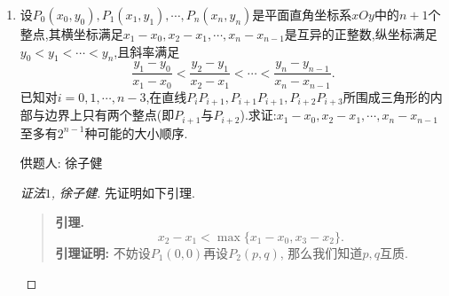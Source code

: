 \documentclass[lang=cn,12pt,a4paper]{elegantpaper.cls}
\begin{document}
\begin{enumerate}
\begin{proof}
\begin{enumerate}[label=(\alph*)]
			设$\beta \in\mathbb N^*$满足\[p_{\beta}\leq \dfrac{p_\varepsilon+1}{2}<p_{\beta+1},\]则\[\varepsilon-\beta=\pi(p_\varepsilon)-\pi(\dfrac{p_\varepsilon+1}{2})>\alpha,\]即$\varepsilon-\alpha>\beta$. 定义函数$g: \mathbb N^*\mapsto \mathbb N^*$, \[g(t)=\prod_{\substack{p\text{为素数}\\v_p(t)\text{为奇数}}} p.\]注意到\[\prod_{i=\alpha+1}^{\beta}(p_i^2-1)=2^{2\varepsilon-2\alpha}\prod_{i=\alpha+1}^{\varepsilon}\dfrac{p_i-1}{2}\prod_{i=\alpha+1}^{\varepsilon}\dfrac{p_i+1}{2},\]从而\[\Omega\left(\prod_{i=\alpha+1}^{\varepsilon}p_i^2-1\right)\leq \dfrac{p_\varepsilon+1}{2}.\]而对任意集合$A\subseteq \{\alpha+1,\alpha+2,\cdots,\varepsilon\}$,\[g\left(\prod_{i\in A}(p_i^2-1)\right)\in\left\{\prod_{i=1}^{\beta}p_i^{r_i}\Big| r_i\in\{0,1\}, 1\leq i\leq \beta\right\},\]从而$g\left(\prod_{i\in A}(p_i^2-1)\right)$的取值至多有$2^\beta$种可能. 又这样的$A$一共有$2^{\varepsilon-\alpha}$个, 且$2^{\varepsilon-\alpha}>2^\beta$, 故存在两个不同的集合$A_1,A_2\subseteq \{\alpha+1,\alpha+2,\cdots,\varepsilon\}$, 使得\[g\left(\prod_{i\in A_1}(p_i^2-1)\right)=g\left(\prod_{i\in A_2}(p_i^2-1)\right),\]这说明\[\prod_{i\in A_1}(p_i^2-1)\prod_{i\in A_2}(p_i^2-1)\]为完全平方数, 进而\[\prod_{i\in A_1\Delta A_2}(p_i^2-1)\]为完全平方数. 取非空集合$A'=A_1\Delta A_2$, 令\[l=\prod_{i\in A'}p_i,\]则\[\sigma(l)\varphi(l)=\prod_{i\in A_1\Delta A_2}(p_i^2-1)\]为完全平方数. 又$l$含有大于$p_\alpha$的素因子, 这与反证假设矛盾, 原命题得证.
		\end{enumerate}
	\end{proof}
	
	 \item
	 设$P_0(x_0,y_0),P_1(x_1,y_1),\cdots,P_n(x_n,y_n)$是平面直角坐标系$xOy$中的$n+1$个整点,其横坐标满足$x_1-x_0,x_2-x_1,\cdots,x_n-x_{n-1}$是互异的正整数,纵坐标满足$y_0<y_1<\cdots<y_n$,且斜率满足
	 \[\dfrac{y_1-y_0}{x_1-x_0}<\dfrac{y_2-y_1}{x_2-x_1}<\cdots<\dfrac{y_n-y_{n-1}}{x_n-x_{n-1}}.\]
	 已知对$i=0,1,\cdots,n-3$,在直线$P_iP_{i+1},P_{i+1}P_{i+1},P_{i+2}P_{i+3}$所围成三角形的内部与边界上只有两个整点(即$P_{i+1}$与$P_{i+2}$).求证:$x_1-x_0,x_2-x_1,\cdots,x_n-x_{n-1}$至多有$2^{n-1}$种可能的大小顺序.
	 \begin{flushright}
	 	\kaishu
	 	供题人: 徐子健
	 \end{flushright}
	\begin{proof}[证法$1$, 徐子健]
		先证明如下引理.
		\begin{quote}
			\textbf{引理.}
			\[x_2-x_1<\max \{x_1-x_0,x_3-x_2\}.\]
			\textbf{引理证明:}
			不妨设$P_1(0,0)$再设$P_2(p,q)$, 那么我们知道$p,q$互质.
		

\end{quote}
\end{proof}
\end{enumerate}
\end{document}
